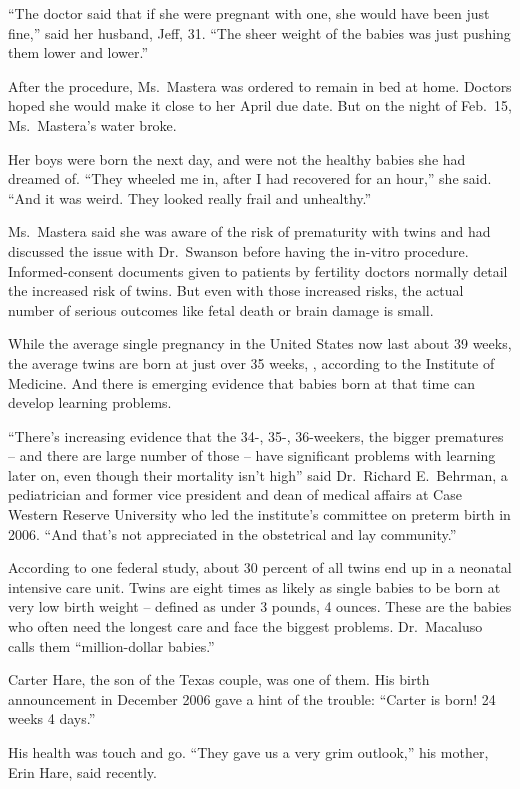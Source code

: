 ﻿\documentclass[12pt]{article}
\begin{document}
``The doctor said that if she were pregnant with one, she would have been just fine,'' said her
husband, Jeff, 31. ``The sheer weight of the babies was just pushing them lower and lower.''

After the procedure, Ms.~Mastera was ordered to remain in bed at home. Doctors hoped she would make
it close to her April due date. But on the night of Feb.~15, Ms.~Mastera's water broke.

Her boys were born the next day, and were not the healthy babies she had dreamed of. ``They wheeled
me in, after I had recovered for an hour,'' she said. ``And it was weird. They looked really frail
and unhealthy.''

Ms.~Mastera said she was aware of the risk of prematurity with twins and had discussed the issue
with Dr.~Swanson before having the in-vitro procedure. Informed-consent documents given to patients
by fertility doctors normally detail the increased risk of twins. But even with those increased
risks, the actual number of serious outcomes like fetal death or brain damage is small.

While the average single pregnancy in the United States now last about 39 weeks, the average twins
are born at just over 35 weeks, , according to the Institute of Medicine. And there is emerging
evidence that babies born at that time can develop learning problems.

``There's increasing evidence that the 34-, 35-, 36-weekers, the bigger prematures -- and there are
large number of those -- have significant problems with learning later on, even though their
mortality isn't high'' said Dr.~Richard E.~Behrman, a pediatrician and former vice president and
dean of medical affairs at Case Western Reserve University who led the institute's committee on
preterm birth in 2006. ``And that's not appreciated in the obstetrical and lay community.''

According to one federal study, about 30 percent of all twins end up in a neonatal intensive care
unit. Twins are eight times as likely as single babies to be born at very low birth weight --
defined as under 3 pounds, 4 ounces. These are the babies who often need the longest care and face
the biggest problems. Dr.~Macaluso calls them ``million-dollar babies.''

Carter Hare, the son of the Texas couple, was one of them. His birth announcement in December 2006
gave a hint of the trouble: ``Carter is born! 24 weeks 4 days.''

His health was touch and go. ``They gave us a very grim outlook,'' his mother, Erin Hare, said
recently.
\end{document}
